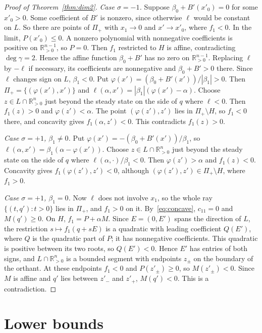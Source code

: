 \documentclass[11pt]{amsart}
\theoremstyle{definition}
\theoremstyle{remark}
\newcommand{\Rpos}{\mathbb R_{>0}}
\begin{document}
\begin{proof}[Proof of Theorem~\ref{thm:dim2}]
\emph{Case $\sigma=-1$.} Suppose $\beta_0+B'(x'_0)=0$ for some $x'_0>0$. Some coefficient of $B'$ is nonzero, since otherwise $\ell$ would be constant on $L$. So there are points of $\Pi_+$ with $x_1\to0$ and $x'\to x'_0$, where $f_1<0$. In the limit, $P(x'_0)\le0$. A nonzero polynomial with nonnegative coefficients is positive on $\Rpos^{n-1}$, so $P=0$. Then $f_1$ restricted to $H$ is affine, contradicting $\deg\gamma=2$. Hence the affine function $\beta_0+B'$ has no zero on $\Rpos^{n-1}$. Replacing $\ell$ by $-\ell$ if necessary, its coefficients are nonnegative and $\beta_0+B'>0$ there. Since $\ell$ changes sign on $L$, $\beta_1<0$. Put $\varphi(x')=(\beta_0+B'(x'))/|\beta_1|>0$. Then $\Pi_+=\{(\varphi(x'),x')\}$ and $\ell(\alpha,x')=|\beta_1|(\varphi(x')-\alpha)$. Choose $z\in L\cap\Rpos^n$ just beyond the steady state on the side of $q$ where $\ell<0$. Then $f_1(z)>0$ and $\varphi(z')<\alpha$. The point $(\varphi(z'),z')$ lies in $\Pi_+\setminus H$, so $f_1<0$ there, and concavity gives $f_1(\alpha,z')<0$. This contradicts $f_1(z)>0$.

\emph{Case $\sigma=+1$, $\beta_1\ne0$.} Put $\varphi(x')=-(\beta_0+B'(x'))/\beta_1$, so $\ell(\alpha,x')=\beta_1(\alpha-\varphi(x'))$. Choose $z\in L\cap\Rpos^n$ just beyond the steady state on the side of $q$ where $\ell(\alpha,\cdot)/\beta_1<0$. Then $\varphi(z')>\alpha$ and $f_1(z)<0$. Concavity gives $f_1(\varphi(z'),z')<0$, although $(\varphi(z'),z')\in\Pi_+\setminus H$, where $f_1>0$.

\emph{Case $\sigma=+1$, $\beta_1=0$.} Now $\ell$ does not involve $x_1$, so the whole ray $\{(t,q'):t>0\}$ lies in $\Pi_+$, and $f_1>0$ on it. By~\eqref{eq:concave}, $c_{11}=0$ and $M(q')\ge0$. On $H$, $f_1=P+\alpha M$. Since $E=(0,E')$ spans the direction of $L$, the restriction $s\mapsto f_1(q+sE)$ is a quadratic with leading coefficient $Q(E')$, where $Q$ is the quadratic part of $P$; it has nonnegative coefficients. This quadratic is positive between its two roots, so $Q(E')<0$. Hence $E'$ has entries of both signs, and $L\cap\Rpos^n$ is a bounded segment with endpoints $z_\pm$ on the boundary of the orthant. At these endpoints $f_1<0$ and $P(z'_\pm)\ge0$, so $M(z'_\pm)<0$. Since $M$ is affine and $q'$ lies between $z'_-$ and $z'_+$, $M(q')<0$. This is a contradiction.
\end{proof}

\section{Lower bounds}
\end{document}
